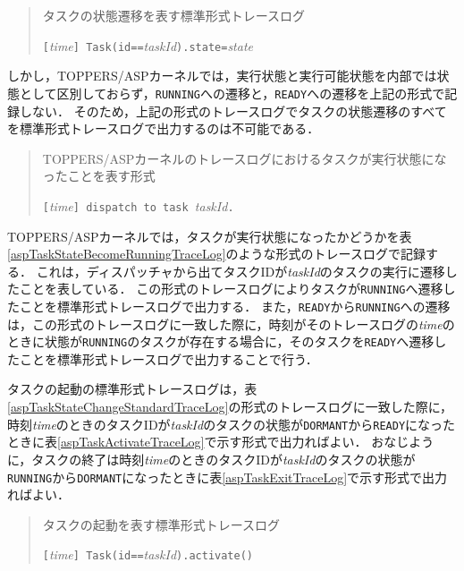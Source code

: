 \begin{table}[p]
\begin{quote}
\caption{タスクの状態遷移を表す標準形式トレースログ}
\label{aspTaskStateChangeStandardTraceLog}
\begin{breakbox}
{\tt [}{\it time}{\tt ] Task(id==}{\it taskId}{\tt ).state=}{\it state}
\end{breakbox}
\end{quote}
\end{table}

しかし，TOPPERS/ASPカーネルでは，実行状態と実行可能状態を内部では状態として区別しておらず，{\tt RUNNING}への遷移と，{\tt READY}への遷移を上記の形式で記録しない．
そのため，上記の形式のトレースログでタスクの状態遷移のすべてを標準形式トレースログで出力するのは不可能である．

\begin{table}[p]
\begin{quote}
\caption{TOPPERS/ASPカーネルのトレースログにおけるタスクが実行状態になったことを表す形式}
\label{aspTaskStateBecomeRunningTraceLog}
\begin{breakbox}
{\tt [}{\it time}{\tt ] dispatch to task }{\it taskId}{\tt .}
\end{breakbox}
\end{quote}
\end{table}

TOPPERS/ASPカーネルでは，タスクが実行状態になったかどうかを表\ref{aspTaskStateBecomeRunningTraceLog}のような形式のトレースログで記録する．
これは，ディスパッチャから出てタスクIDが{\it taskId}のタスクの実行に遷移したことを表している．
この形式のトレースログによりタスクが{\tt RUNNING}へ遷移したことを標準形式トレースログで出力する．
また，{\tt READY}から{\tt RUNNING}への遷移は，この形式のトレースログに一致した際に，時刻がそのトレースログの{\it time}のときに状態が{\tt RUNNING}のタスクが存在する場合に，そのタスクを{\tt READY}へ遷移したことを標準形式トレースログで出力することで行う．

タスクの起動の標準形式トレースログは，表\ref{aspTaskStateChangeStandardTraceLog}の形式のトレースログに一致した際に，時刻{\it time}のときのタスクIDが{\it taskId}のタスクの状態が{\tt DORMANT}から{\tt READY}になったときに表\ref{aspTaskActivateTraceLog}で示す形式で出力ればよい．
おなじように，タスクの終了は時刻{\it time}のときのタスクIDが{\it taskId}のタスクの状態が{\tt RUNNING}から{\tt DORMANT}になったときに表\ref{aspTaskExitTraceLog}で示す形式で出力ればよい．

\begin{table}[p]
\begin{quote}
\caption{タスクの起動を表す標準形式トレースログ}
\label{aspTaskActivateTraceLog}
\begin{breakbox}
{\tt [}{\it time}{\tt ] Task(id==}{\it taskId}{\tt ).activate()}
\end{breakbox}
\end{quote}
\end{table}

